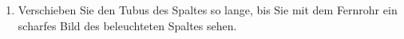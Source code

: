 \begin{enumerate}
 \item Verschieben Sie den Tubus des Spaltes so lange, bis Sie mit dem Fernrohr ein scharfes Bild des beleuchteten Spaltes sehen.

\end{enumerate}
